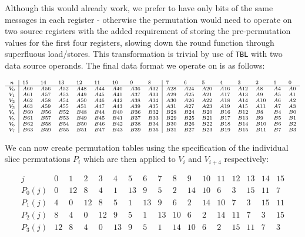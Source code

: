 Although this would already work, we prefer to have only bits of the same
messages in each register - otherwise the permutation would need to operate on
two source registers with the added requirement of storing the pre-permutation
values for the first four registers, slowing down the round function through
superfluous load/stores. This transformation is trivial by use of
\texttt{TBL} with two data source operands. The final data format we operate on
is as follows:

\[
    \scriptsize
    \begin{array}{c|llllllll|llllllll}
        n & 15 & 14 & 13 & 12 & 11 & 10 & 9 & 8 & 7 & 6 & 5 & 4 & 3 & 2 & 1 & 0 \\
        \hline
        V_0 & A60 & A56 & A52 & A48 & A44 & A40 & A36 & A32 & A28 & A24 & A20 & A16 & A12 & A8  & A4 & A0 \\
        V_1 & A61 & A57 & A53 & A49 & A45 & A41 & A37 & A33 & A29 & A25 & A21 & A17 & A13 & A9  & A5 & A1 \\
        V_2 & A62 & A58 & A54 & A50 & A46 & A42 & A38 & A34 & A30 & A26 & A22 & A18 & A14 & A10 & A6 & A2 \\
        V_3 & A63 & A59 & A55 & A51 & A47 & A43 & A39 & A35 & A31 & A27 & A23 & A19 & A15 & A11 & A7 & A3 \\
        V_4 & B60 & B56 & B52 & B48 & B44 & B40 & B36 & B32 & B28 & B24 & B20 & B16 & B12 & B8  & B4 & B0 \\
        V_5 & B61 & B57 & B53 & B49 & B45 & B41 & B37 & B33 & B29 & B25 & B21 & B17 & B13 & B9  & B5 & B1 \\
        V_6 & B62 & B58 & B54 & B50 & B46 & B42 & B38 & B34 & B30 & B26 & B22 & B18 & B14 & B10 & B6 & B2 \\
        V_7 & B63 & B59 & B55 & B51 & B47 & B43 & B39 & B35 & B31 & B27 & B23 & B19 & B15 & B11 & B7 & B3
    \end{array}
\]

We can now create permutation tables using the specification of the individual
slice permutations $P_i$ which are then applied to $V_i$ and $V_{i+4}$
respectively:

\[
    \begin{array}{c|llllllllllllllll}
        j & 0 & 1 & 2 & 3 & 4 & 5 & 6 & 7 & 8 & 9 & 10 & 11 & 12 & 13 & 14 & 15 \\
        \hline
        P_0(j) & 0 & 12 & 8 & 4 & 1 & 13 & 9 & 5 & 2 & 14 & 10 & 6 & 3 & 15 & 11 & 7 \\
        P_1(j) & 4 & 0 & 12 & 8 & 5 & 1 & 13 & 9 & 6 & 2 & 14 & 10 & 7 & 3 & 15 & 11 \\
        P_2(j) & 8 & 4 & 0 & 12 & 9 & 5 & 1 & 13 & 10 & 6 & 2 & 14 & 11 & 7 & 3 & 15 \\
        P_3(j) & 12 & 8 & 4 & 0 & 13 & 9 & 5 & 1 & 14 & 10 & 6 & 2 & 15 & 11 & 7 & 3
    \end{array}
\]

